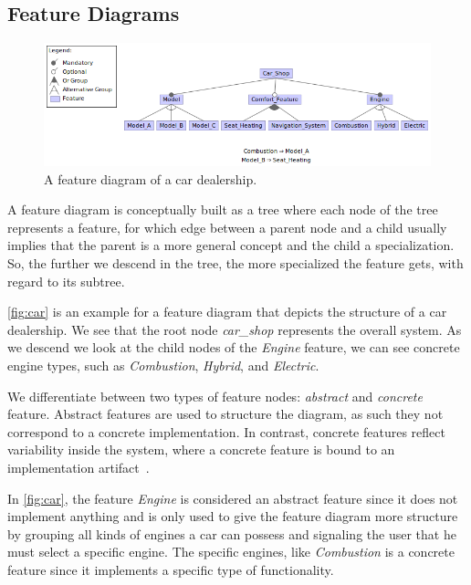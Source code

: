 \subsection{Feature Diagrams}\label{ch:feature-diagram}

\begin{figure}[h]
    \centering
    \includegraphics[scale=0.55]{gfx/Car_Shop.png}
    \caption{A feature diagram of a car dealership.}
    \label{fig:car}
\end{figure}

A feature diagram is conceptually built as a tree where each node of the tree represents a feature, 
for which edge between a parent node and a child usually implies that the parent is a more general concept and the child a specialization. 
So, the further we descend in the tree, the more specialized the feature gets, with regard to its subtree.

\autoref{fig:car} is an example for a feature diagram that depicts the structure of a car dealership. We see that the root
node \textit{car\_shop} represents the overall system. As we descend we look at the child nodes of the
\textit{Engine} feature, we can see concrete engine types, such as \textit{Combustion}, \textit{Hybrid}, and \textit{Electric}.

We differentiate between two types of feature nodes: \emph{abstract} and \emph{concrete} feature. 
Abstract features are used to structure the diagram, as such they not correspond to a concrete implementation.
In contrast, concrete features reflect variability inside the system, where a concrete feature is bound to an implementation artifact~\cite{Feature-Oriented-Software-Product-Lines}.

In \autoref{fig:car}, the feature \textit{Engine} is considered an abstract feature since it does not implement anything and 
is only used to give the feature diagram more structure by grouping all kinds of engines a car can possess and signaling 
the user that he must select a specific engine.
The specific engines, like \textit{Combustion} is a concrete feature since it implements a specific type of functionality.

